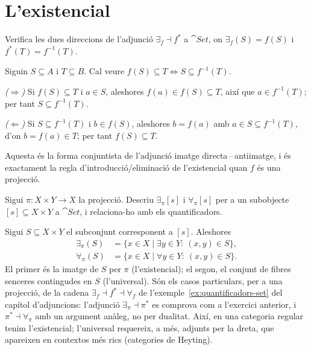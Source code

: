 \section{L'existencial}

\begin{exercici}
Verifica les dues direccions de l'adjunció $\exists_f\dashv f^{*}$ a $\cat{Set}$, on $\exists_f(S)=f(S)$ i $f^{*}(T)=f^{-1}(T)$.
\end{exercici}

\begin{solucio}
Siguin $S\subseteq A$ i $T\subseteq B$. Cal veure $f(S)\subseteq T\Leftrightarrow S\subseteq f^{-1}(T)$.

\emph{($\Rightarrow$)} Si $f(S)\subseteq T$ i $a\in S$, aleshores $f(a)\in f(S)\subseteq T$, així que $a\in f^{-1}(T)$; per tant $S\subseteq f^{-1}(T)$.

\emph{($\Leftarrow$)} Si $S\subseteq f^{-1}(T)$ i $b\in f(S)$, aleshores $b=f(a)$ amb $a\in S\subseteq f^{-1}(T)$, d'on $b=f(a)\in T$; per tant $f(S)\subseteq T$.

Aquesta és la forma conjuntista de l'adjunció imatge directa\,--\,antiimatge, i és exactament la regla d'introducció/eliminació de l'existencial quan $f$ és una projecció.
\end{solucio}

\begin{exercici}
Sigui $\pi\colon X\times Y\to X$ la projecció. Descriu $\exists_\pi[s]$ i $\forall_\pi[s]$ per a un subobjecte $[s]\subseteq X\times Y$ a $\cat{Set}$, i relaciona-ho amb els quantificadors.
\end{exercici}

\begin{solucio}
Sigui $S\subseteq X\times Y$ el subconjunt corresponent a $[s]$. Aleshores
\[
\begin{aligned}
\exists_\pi(S)&=\{x\in X\mid \exists y\in Y:\ (x,y)\in S\},\\
\forall_\pi(S)&=\{x\in X\mid \forall y\in Y:\ (x,y)\in S\}.
\end{aligned}
\]
El primer és la imatge de $S$ per $\pi$ (l'existencial); el segon, el conjunt de fibres senceres contingudes en $S$ (l'universal). Són els casos particulars, per a una projecció, de la cadena $\exists_f\dashv f^{*}\dashv\forall_f$ de l'exemple~\ref{ex:quantificadors-set} del capítol d'adjuncions: l'adjunció $\exists_\pi\dashv\pi^{*}$ es comprova com a l'exercici anterior, i $\pi^{*}\dashv\forall_\pi$ amb un argument anàleg, no per dualitat. Així, en una categoria regular tenim l'existencial; l'universal requereix, a més, adjunts per la dreta, que apareixen en contextos més rics (categories de Heyting).
\end{solucio}


